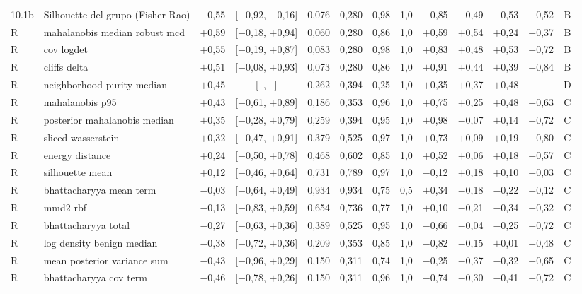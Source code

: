\begin{longtable}{@{}l>{\raggedright\arraybackslash}p{3.6cm}rcrrrrrrrrc@{}}
10.1b & Silhouette del grupo (Fisher-Rao) & $-$0{,}55 & [$-$0{,}92, $-$0{,}16] & 0{,}076 & 0{,}280 & 0{,}98 & 1{,}0 & $-$0{,}85 & $-$0{,}49 & $-$0{,}53 & $-$0{,}52 & B \\
R & mahalanobis median robust mcd & $+$0{,}59 & [$-$0{,}18, $+$0{,}94] & 0{,}060 & 0{,}280 & 0{,}86 & 1{,}0 & $+$0{,}59 & $+$0{,}54 & $+$0{,}24 & $+$0{,}37 & B \\
R & cov logdet & $+$0{,}55 & [$-$0{,}19, $+$0{,}87] & 0{,}083 & 0{,}280 & 0{,}98 & 1{,}0 & $+$0{,}83 & $+$0{,}48 & $+$0{,}53 & $+$0{,}72 & B \\
R & cliffs delta & $+$0{,}51 & [$-$0{,}08, $+$0{,}93] & 0{,}073 & 0{,}280 & 0{,}86 & 1{,}0 & $+$0{,}91 & $+$0{,}44 & $+$0{,}39 & $+$0{,}84 & B \\
R & neighborhood purity median & $+$0{,}45 & [--, --] & 0{,}262 & 0{,}394 & 0{,}25 & 1{,}0 & $+$0{,}35 & $+$0{,}37 & $+$0{,}48 & -- & D \\
R & mahalanobis p95 & $+$0{,}43 & [$-$0{,}61, $+$0{,}89] & 0{,}186 & 0{,}353 & 0{,}96 & 1{,}0 & $+$0{,}75 & $+$0{,}25 & $+$0{,}48 & $+$0{,}63 & C \\
R & posterior mahalanobis median & $+$0{,}35 & [$-$0{,}28, $+$0{,}79] & 0{,}259 & 0{,}394 & 0{,}95 & 1{,}0 & $+$0{,}98 & $-$0{,}07 & $+$0{,}14 & $+$0{,}72 & C \\
R & sliced wasserstein & $+$0{,}32 & [$-$0{,}47, $+$0{,}91] & 0{,}379 & 0{,}525 & 0{,}97 & 1{,}0 & $+$0{,}73 & $+$0{,}09 & $+$0{,}19 & $+$0{,}80 & C \\
R & energy distance & $+$0{,}24 & [$-$0{,}50, $+$0{,}78] & 0{,}468 & 0{,}602 & 0{,}85 & 1{,}0 & $+$0{,}52 & $+$0{,}06 & $+$0{,}18 & $+$0{,}57 & C \\
R & silhouette mean & $+$0{,}12 & [$-$0{,}46, $+$0{,}64] & 0{,}731 & 0{,}789 & 0{,}97 & 1{,}0 & $-$0{,}12 & $+$0{,}18 & $+$0{,}10 & $+$0{,}03 & C \\
R & bhattacharyya mean term & $-$0{,}03 & [$-$0{,}64, $+$0{,}49] & 0{,}934 & 0{,}934 & 0{,}75 & 0{,}5 & $+$0{,}34 & $-$0{,}18 & $-$0{,}22 & $+$0{,}12 & C \\
R & mmd2 rbf & $-$0{,}13 & [$-$0{,}83, $+$0{,}59] & 0{,}654 & 0{,}736 & 0{,}77 & 1{,}0 & $+$0{,}10 & $-$0{,}21 & $-$0{,}34 & $+$0{,}32 & C \\
R & bhattacharyya total & $-$0{,}27 & [$-$0{,}63, $+$0{,}36] & 0{,}389 & 0{,}525 & 0{,}95 & 1{,}0 & $-$0{,}66 & $-$0{,}04 & $-$0{,}25 & $-$0{,}72 & C \\
R & log density benign median & $-$0{,}38 & [$-$0{,}72, $+$0{,}36] & 0{,}209 & 0{,}353 & 0{,}85 & 1{,}0 & $-$0{,}82 & $-$0{,}15 & $+$0{,}01 & $-$0{,}48 & C \\
R & mean posterior variance sum & $-$0{,}43 & [$-$0{,}96, $+$0{,}29] & 0{,}150 & 0{,}311 & 0{,}74 & 1{,}0 & $-$0{,}25 & $-$0{,}37 & $-$0{,}32 & $-$0{,}65 & C \\
R & bhattacharyya cov term & $-$0{,}46 & [$-$0{,}78, $+$0{,}26] & 0{,}150 & 0{,}311 & 0{,}96 & 1{,}0 & $-$0{,}74 & $-$0{,}30 & $-$0{,}41 & $-$0{,}72 & C \\
\bottomrule
\end{longtable}
